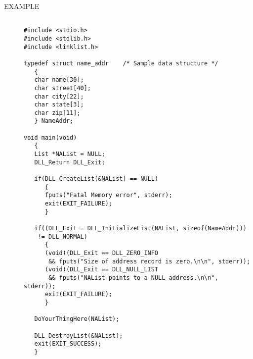 \documentclass[10pt,letterpaper,titlepage]{article}
\begin{document}
\begin{description}
\item[EXAMPLE]
\small
\begin{verbatim}

#include <stdio.h>
#include <stdlib.h>
#include <linklist.h>

typedef struct name_addr    /* Sample data structure */
   {
   char name[30];
   char street[40];
   char city[22];
   char state[3];
   char zip[11];
   } NameAddr;

void main(void)
   {
   List *NAList = NULL;
   DLL_Return DLL_Exit;

   if(DLL_CreateList(&NAList) == NULL)
      {
      fputs("Fatal Memory error", stderr);
      exit(EXIT_FAILURE);
      }

   if((DLL_Exit = DLL_InitializeList(NAList, sizeof(NameAddr)))
    != DLL_NORMAL)
      {
      (void)(DLL_Exit == DLL_ZERO_INFO
       && fputs("Size of address record is zero.\n\n", stderr));
      (void)(DLL_Exit == DLL_NULL_LIST
       && fputs("NAList points to a NULL address.\n\n", stderr));
      exit(EXIT_FAILURE);
      }

   DoYourThingHere(NAList);

   DLL_DestroyList(&NAList);
   exit(EXIT_SUCCESS);
   }
\end{verbatim}
\normalsize

\end{description}
\pagebreak
\end{document}
